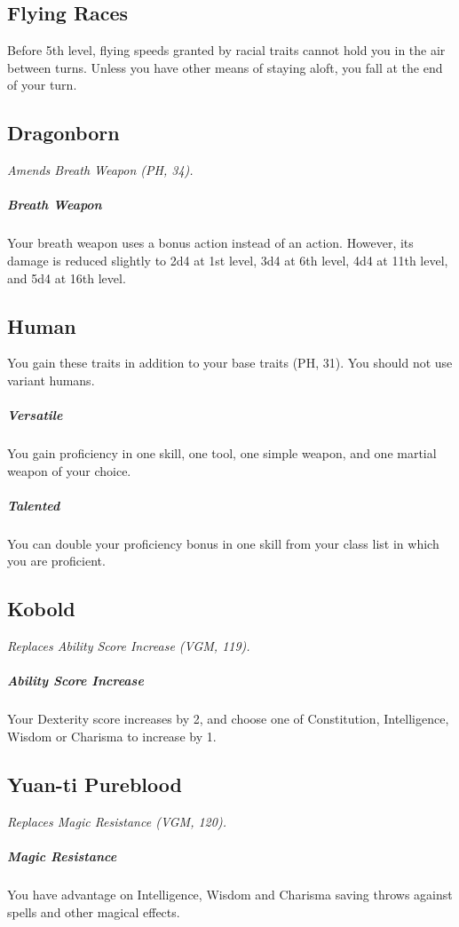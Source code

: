 \documentclass[letterpaper,twocolumn,openany,nodeprecatedcode]{dndbook}
\begin{document}
\subsection{Flying Races} Before 5th level, flying speeds granted by racial traits cannot hold you in the air between turns. Unless you have other means of staying aloft, you fall at the end of your turn.

\label{balance-race-dragonborn}
\subsection{Dragonborn}
\textit{Amends Breath Weapon (PH, 34).}

\subparagraph{Breath Weapon} Your breath weapon uses a bonus action instead of an action. However, its damage is reduced slightly to 2d4 at 1st level, 3d4 at 6th level, 4d4 at 11th level, and 5d4 at 16th level.

\label{balance-race-human}
\subsection{Human}

You gain these traits in addition to your base traits (PH, 31). You should not use variant humans.

\subparagraph{Versatile} You gain proficiency in one skill, one tool, one simple weapon, and one martial weapon of your choice.
\subparagraph{Talented} You can double your proficiency bonus in one skill from your class list in which you are proficient.

\label{balance-race-kobold}
\subsection{Kobold}
\textit{Replaces Ability Score Increase (VGM, 119).}

\subparagraph{Ability Score Increase} Your Dexterity score increases by 2, and choose one of Constitution, Intelligence, Wisdom or Charisma to increase by 1.

\label{balance-race-yuanti}
\subsection{Yuan-ti Pureblood}
\textit{Replaces Magic Resistance (VGM, 120).}

\subparagraph{Magic Resistance} You have advantage on Intelligence, Wisdom and Charisma saving throws against spells and other magical effects.
\end{document}
